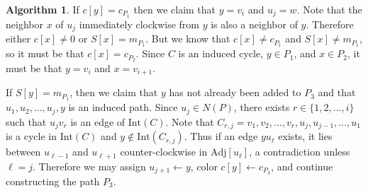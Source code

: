 \documentclass[12pt,letterpaper]{article}
\theoremstyle{plain}
\theoremstyle{definition}
\theoremstyle{break}
\newtheorem{algorithm}[lemma]{Algorithm}     %
\begin{document}
\begin{algorithm}
If $c[y]=c_{P_1}$ then we claim that $y=v_i$ and $u_j=w$. Note that the
neighbor $x$ of $u_j$ immediately clockwise from $y$ is also a neighbor of $y$.
Therefore either $c[x]\ne 0$ or $S[x]=m_{P_1}$. But we know
that $c[x]\ne c_{P_1}$ and $S[x]\ne m_{P_1}$, so it must be that
$c[x]=c_{P_2}$. Since $C$ is an induced cycle, $y\in P_1$, and $x\in P_2$, it
must be that $y=v_i$ and $x=v_{i+1}$.

If $S[y]=m_{P_1}$, then we claim that $y$ has not already been added to
$P_3$ and that $u_1,u_2,\ldots,u_j,y$ is an induced
path. Since $u_j\in N(P)$, there exists $r\in\{1,2,\ldots,i\}$ such that
$u_jv_r$ is an edge of $\text{Int}(C)$. Note that
$C_{r,j}=v_1,v_2,\ldots,v_r,u_j,u_{j-1},\ldots,u_1$ is a cycle in
$\text{Int}(C)$
and $y\not\in\text{Int}(C_{r,j})$.
Thus if an edge $yu_\ell$ exists, it lies
between $u_{\ell-1}$ and $u_{\ell+1}$ counter-clockwise in
$\text{Adj}[u_\ell]$, a contradiction
unless $\ell=j$. Therefore we may assign $u_{j+1}\leftarrow y$, color
$c[y]\leftarrow c_{P_3}$, and continue constructing the path $P_3$.

\begin{figure}[ht]
\begin{center}
\end{center}
\end{figure}
\end{algorithm}
\end{document}
